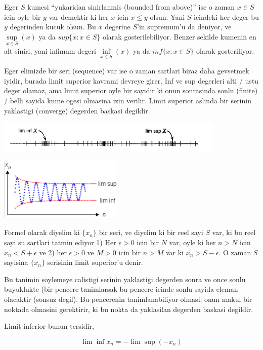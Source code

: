 \documentclass[12pt,fleqn]{article}
\begin{document}
\vspace{10cm}

Eger $S$ kumesi ``yukaridan sinirlanmis (bounded from above)'' ise o zaman
$x \in S$ icin oyle bir $y$ var demektir ki her $x$ icin $x \le y$
olsun. Yani $S$ icindeki her deger bu $y$ degerinden kucuk olsun. Bu $x$
degerine $S$'in supremum'u da deniyor, ve $\sup\limits_{x \in S}(x)$ ya da
$sup\{x:x \in S\}$ olarak gosterilebiliyor. Benzer sekilde kumenin en alt
siniri, yani infimum degeri $\inf\limits_{x \in S}(x)$ ya da $inf\{x:x \in
S\}$ olarak gosteriliyor. 

Eger elimizde bir seri (sequence) var ise o zaman sartlari biraz daha
gevsetmek iyidir, burada limit superior kavrami devreye girer. Inf ve sup
degerleri alti / ustu deger olamaz, ama limit superior oyle bir sayidir ki
onun sonrasinda sonlu (finite) / belli sayida kume ogesi olmasina izin
verilir. Limit superior aslinda bir serinin yaklastigi (converge) degerden
baskasi degildir. 

\includegraphics[height=1.5cm]{1_01.png}

\includegraphics[height=3cm]{1_02.png}

Formel olarak diyelim ki $\{x_n\}$ bir seri, ve diyelim ki bir reel
sayi $S$ var, ki bu reel sayi su sartlari tatmin ediyor 
1) Her $\epsilon > 0$ icin bir $N$ var, oyle ki her $n>N$ icin $x_n
< S + \epsilon$ 
ve 2) her $\epsilon > 0$ ve $M>0$ icin bir  $n>M$ var ki $x_n
> S - \epsilon$. O 
zaman $S$ sayisina  $\{x_n\}$ serisinin limit superior'u denir. 

Bu tanimin soylemeye calistigi serinin yaklastigi degerden sonra ve once
sonlu buyuklukte (bir pencere tanimlarsak bu pencere icinde sonlu sayida
eleman olacaktir (sonsuz degil). Bu pencerenin tanimlanabiliyor olmasi,
onun makul bir noktada olmasini gerektirir, ki bu nokta da yaklasilan
degerden baskasi degildir. 

Limit inferior bunun tersidir, 

\[ \lim \inf x_n  = -\lim \sup(-x_n)\]
\end{document}
